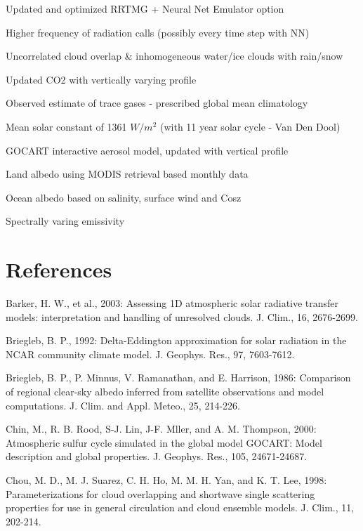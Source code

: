 \begin{DoxyItemize}
\item Updated and optimized R\+R\+T\+MG + Neural Net Emulator option
\item Higher frequency of radiation calls (possibly every time step with NN)
\item Uncorrelated cloud overlap \& inhomogeneous water/ice clouds with rain/snow
\item Updated C\+O2 with vertically varying profile
\item Observed estimate of trace gases -\/ prescribed global mean climatology
\item Mean solar constant of 1361 $W/m^2$ (with 11 year solar cycle -\/ Van Den Dool)
\item G\+O\+C\+A\+RT interactive aerosol model, updated with vertical profile
\item Land albedo using M\+O\+D\+IS retrieval based monthly data
\item Ocean albedo based on salinity, surface wind and Cosz
\item Spectrally varing emissivity
\end{DoxyItemize}\hypertarget{index_References}{}\section{References}\label{index_References}
Barker, H. W., et al., 2003\+: Assessing 1D atmospheric solar radiative transfer models\+: interpretation and handling of unresolved clouds. J. Clim., 16, 2676-\/2699.

Briegleb, B. P., 1992\+: Delta-\/\+Eddington approximation for solar radiation in the N\+C\+AR community climate model. J. Geophys. Res., 97, 7603-\/7612.

Briegleb, B. P., P. Minnus, V. Ramanathan, and E. Harrison, 1986\+: Comparison of regional clear-\/sky albedo inferred from satellite observations and model computations. J. Clim. and Appl. Meteo., 25, 214-\/226.

Chin, M., R. B. Rood, S-\/J. Lin, J-\/F. Mller, and A. M. Thompson, 2000\+: Atmospheric sulfur cycle simulated in the global model G\+O\+C\+A\+RT\+: Model description and global properties. J. Geophys. Res., 105, 24671-\/24687.

Chou, M. D., M. J. Suarez, C. H. Ho, M. M. H. Yan, and K. T. Lee, 1998\+: Parameterizations for cloud overlapping and shortwave single scattering properties for use in general circulation and cloud ensemble models. J. Clim., 11, 202-\/214.

